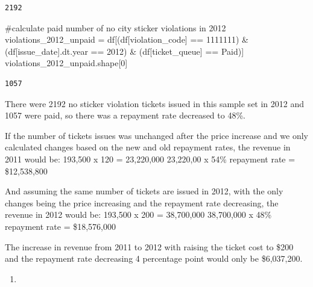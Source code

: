\documentclass[
]{article}
\newenvironment{Shaded}{\begin{snugshade}}{\end{snugshade}}
\newcommand{\CommentTok}[1]{\textcolor[rgb]{0.37,0.37,0.37}{#1}}
\newcommand{\DecValTok}[1]{\textcolor[rgb]{0.68,0.00,0.00}{#1}}
\newcommand{\NormalTok}[1]{\textcolor[rgb]{0.00,0.23,0.31}{#1}}
\newcommand{\OperatorTok}[1]{\textcolor[rgb]{0.37,0.37,0.37}{#1}}
\newcommand{\StringTok}[1]{\textcolor[rgb]{0.13,0.47,0.30}{#1}}
\providecommand{\tightlist}{%
  \setlength{\itemsep}{0pt}\setlength{\parskip}{0pt}}\usepackage{longtable,booktabs,array}
\begin{document}
\begin{verbatim}
2192
\end{verbatim}

\begin{Shaded}
\begin{Highlighting}[]
\CommentTok{\#calculate paid number of no city sticker violations in 2012}
\NormalTok{violations\_2012\_unpaid }\OperatorTok{=}\NormalTok{ df[(df[}\StringTok{\textquotesingle{}violation\_code\textquotesingle{}}\NormalTok{] }\OperatorTok{==} \StringTok{\textquotesingle{}1111111\textquotesingle{}}\NormalTok{) }\OperatorTok{\&}\NormalTok{ (df[}\StringTok{\textquotesingle{}issue\_date\textquotesingle{}}\NormalTok{].dt.year }\OperatorTok{==} \DecValTok{2012}\NormalTok{) }\OperatorTok{\&}\NormalTok{ (df[}\StringTok{\textquotesingle{}ticket\_queue\textquotesingle{}}\NormalTok{] }\OperatorTok{==} \StringTok{\textquotesingle{}Paid\textquotesingle{}}\NormalTok{)]}
\NormalTok{violations\_2012\_unpaid.shape[}\DecValTok{0}\NormalTok{]}
\end{Highlighting}
\end{Shaded}

\begin{verbatim}
1057
\end{verbatim}

There were 2192 no sticker violation tickets issued in this sample set
in 2012 and 1057 were paid, so there was a repayment rate decreased to
48\%.

If the number of tickets issues was unchanged after the price increase
and we only calculated changes based on the new and old repayment rates,
the revenue in 2011 would be: 193,500 x 120 = 23,220,000 23,220,00 x
54\% repayment rate = \$12,538,800

And assuming the same number of tickets are issued in 2012, with the
only changes being the price increasing and the repayment rate
decreasing, the revenue in 2012 would be: 193,500 x 200 = 38,700,000
38,700,000 x 48\% repayment rate = \$18,576,000

The increase in revenue from 2011 to 2012 with raising the ticket cost
to \$200 and the repayment rate decreasing 4 percentage point would only
be \$6,037,200.

\begin{enumerate}
\def\labelenumi{\arabic{enumi}.}
\setcounter{enumi}{4}
\tightlist
\item
\end{enumerate}
\end{document}
